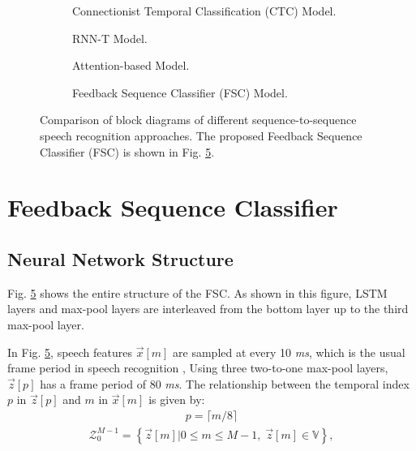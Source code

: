 \documentclass{article}
\begin{document}
\begin{figure}
  \centering
  \begin{subfigure}[b]{0.35\textwidth}
    \centering
    \resizebox{23mm}{!}{
      
    } 
    \caption {
      Connectionist Temporal Classification (CTC) Model.
      \label{fig:ctc_diagram}
    }
  \end{subfigure}
  \begin{subfigure}[b]{0.60\textwidth}
    \centering
    \resizebox{78mm}{!}{
      
    }
    \caption {
      RNN-T Model.
      \label{fig:rnn_t_diagram}
    }
  \end{subfigure}

  \begin{subfigure}[b]{0.55\textwidth}
    \centering
    \resizebox{53mm}{!}{
      
    }
    \caption {
      Attention-based Model.
      \label{fig:attention_diagram}
    }
  \end{subfigure}
  \begin{subfigure}[b]{0.3\textwidth}
    \centering
    \resizebox{26mm}{!}{
      
    }
    \caption {
      Feedback Sequence Classifier (FSC) Model.
      \label{fig:fsc_diagram}
    }
  \end{subfigure}
  \caption{
    Comparison of block diagrams of different sequence-to-sequence speech
    recognition approaches.
    The proposed Feedback Sequence Classifier (FSC) is shown in 
    Fig. \ref{fig:fsc_diagram}.
  }

\end{figure}




\section{Feedback Sequence Classifier}
\label{sec:feedback_sequence_classifier}


\subsection{Neural Network Structure}
\label{sec:neural_network_structure}
Fig. \ref{fig:fsc_diagram} shows the entire structure of the FSC. 
As shown in this figure, LSTM layers and max-pool layers
are interleaved from the bottom layer up to the third max-pool layer.

In Fig. \ref{fig:fsc_diagram}, speech features $\vec{x}[m]$ are sampled 
at every 10 {\it ms}, which is the usual frame period in speech 
recognition
\cite{x_huang_prentice_hall_2001_00, c_kim_taslp_2016_00},
Using three two-to-one max-pool layers, $\vec{z}[p]$ has a frame period 
of 80 {\it ms}.  
The relationship between the temporal index $p$ in $\vec{z}[p]$ and 
$m$ in $\vec{x}[m]$ is given by: 
\begin{align}
  p = \lceil m / 8 \rceil \label{eq:def_p}
\end{align}
\begin{align}
  \mathcal{Z}_{0}^{M-1}  =  
    \left\{\vec{z}[m]  \Big| 0 \le m \le M-1, \; \vec{z}[m] \in \mathbb{V} \right\}, 
  \label{eq:frame_target_label}
\end{align}
\end{document}
